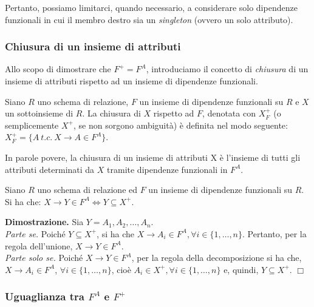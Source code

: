 Pertanto, possiamo limitarci, quando necessario, a considerare solo dipendenze funzionali in cui il
membro destro sia un \emph{singleton} (ovvero un solo attributo).

\subsubsection{Chiusura di un insieme di attributi}

Allo scopo di dimostrare che $F^+ = F^A$, introduciamo il concetto di \emph{chiusura} di un insieme di attributi
rispetto ad un insieme di dipendenze funzionali. 
\begin{defn}
Siano $R$ uno schema di relazione, $F$ un insieme di dipendenze funzionali su $R$ e $X$ un sottoinsieme di $R$.
La chiusura di $X$ rispetto ad $F$, denotata con $X^+_F$ (o semplicemente $X^+$, se non sorgono ambiguità) è 
definita nel modo seguente: $X^+_F = \{A\ t.c.\ X \rightarrow A \in F^A\}$.
\end{defn}
In parole povere, la chiusura di un insieme di attributi X è l'insieme di tutti gli attributi determinati da $X$
tramite dipendenze funzionali in $F^A$.
\label{lemma4_1}
\begin{lem}
Siano $R$ uno schema di relazione ed $F$ un insieme di dipendenze funzionali su $R$. Si ha che:
$X \rightarrow Y \in F^A \Leftrightarrow Y \subseteq X^+$.
\end{lem}

\textbf{Dimostrazione.} Sia $Y = A_1, A_2, \ldots, A_n$.\\
\emph{Parte se.} Poiché $Y \subseteq X^+$, si ha che $X \rightarrow A_i \in F^A, \forall i \in \{1, \ldots, n\}$. 
Pertanto, per la regola dell'unione, $X \rightarrow Y \in F^A$.\\
\emph{Parte solo se.} Poiché $X \rightarrow Y \in F^A$, per la regola della decomposizione si ha che, 
$X \rightarrow A_i \in F^A$, $\forall i \in \{1, \ldots, n\}$, cioè $A_i \in X^+, \forall i \in \{1, \ldots, n\}$ 
e, quindi, $Y \subseteq X^+$. $\Box$

\subsubsection{Uguaglianza tra $F^A$ e $F^+$}

